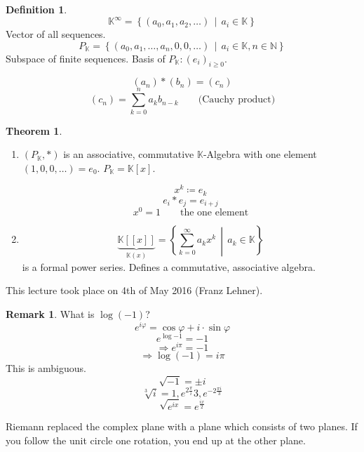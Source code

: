 \documentclass[a4paper,landscape,twocolumn]{article}
\newcommand\meta[3]{This #1 took place on #2 (#3).\par}
\newcommand\setdef[2]{\left\{#1\,\middle|\,#2\right\}}
\theoremstyle{definition}
\newtheorem{theorem}{Theorem}
\newtheorem{defi}{Definition}
\newtheorem{rem}{Remark}
\begin{document}
\begin{defi}
  \label{defi-9.4}
  \[ \mathbb K^\infty = \setdef{(a_0, a_1, a_2, \ldots)}{a_i \in \mathbb K} \]
  Vector of all sequences.
  \[ P_{\mathbb K} = \setdef{(a_0, a_1, \ldots, a_n, 0, 0, \ldots)}{a_i \in \mathbb K, n \in \mathbb N} \]
  Subspace of finite sequences. Basis of $P_{\mathbb K}: (e_i)_{i \geq 0}$.

  \[ (a_n) * (b_n) = (c_n) \]
  \[ (c_n) = \sum_{k=0}^n a_k b_{n-k} \qquad \text{(Cauchy product)} \]
\end{defi}

\begin{theorem}
  \label{satz-9.5}
  \begin{enumerate}
    \item
      $(P_{\mathbb K}, *)$ is an associative, commutative $\mathbb K$-Algebra with one element
      $(1, 0, 0, \ldots) = e_0$. $P_{\mathbb K} = \mathbb K[x]$.

      \[ x^k \coloneqq e_k \]
      \[ e_i * e_j = e_{i+j} \]
      \[ x^0 = 1 \qquad \text{the one element} \]
    \item
      \[ \underbrace{\mathbb K[[x]]}_{\mathbb K(x)} = \setdef{\sum_{k=0}^\infty a_k x^k}{a_k \in \mathbb K} \]
      is a formal power series. Defines a commutative, associative algebra.
  \end{enumerate}
\end{theorem}

\meta{lecture}{4th of May 2016}{Franz Lehner}

\begin{rem}
  What is $\log(-1)$?
  \[ e^{i\varphi}= \cos{\varphi} + i \cdot \sin{\varphi} \]
  \[ e^{\log{-1}} = -1 \]
  \[ \Rightarrow e^{i\pi} = -1 \]
  \[ \Rightarrow \log(-1) = i\pi \]
  This is ambiguous.
  \[ \sqrt{-1} = \pm i \]
  \[ \sqrt[3]{i} = 1, e^{2\frac\pi i}{3}, e^{-2\frac{\pi i}{3}} \]
  \[ \sqrt{e^{ix}} = e^{\frac{ix}{2}} \]

  Riemann replaced the complex plane with a plane which consists of two planes.
  If you follow the unit circle one rotation, you end up at the other plane.
\end{rem}
\end{document}
